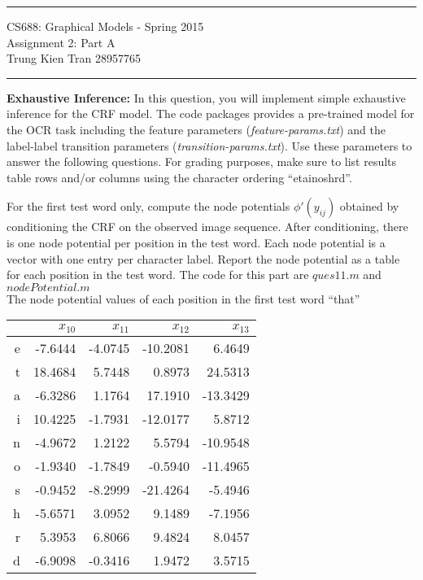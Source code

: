 \documentclass[11pt]{article}
\begin{document}
{\centering
  \rule{6.3in}{2pt}
  \vspace{1em}
  {\Large
    CS688: Graphical Models - Spring 2015\\
    Assignment 2: Part A\\
  }
  \vspace{1em}
 Trung Kien Tran 28957765\\
  \vspace{0.1em}
  \rule{6.3in}{1.5pt}
}\vspace{1em}

\begin{problem}{20} \textbf{Exhaustive Inference:} In this question, you will implement simple exhaustive inference for the CRF model. The code packages provides a pre-trained model for the OCR task including the feature parameters (\textit{feature-params.txt}) and the label-label transition parameters (\textit{transition-params.txt}). Use these parameters to answer the following questions. For grading purposes, make sure to list results table rows and/or columns using the character ordering ``etainoshrd''.

 {For the first test word only, compute the node potentials $\phi'(y_{ij})$ obtained by conditioning the CRF on the observed image sequence. After conditioning, there is one node potential per position in the test word. Each node potential is a vector with one entry per character label. Report the node potential as a table for each position in the test word.} 
The code for this part are $ques11.m$ and $nodePotential.m$\\
The node potential values of each position in the first test word ``that''
\begin{center}
\begin{tabular}{r|r|r|r|r}
 & $x_{10}$ & $x_{11}$ & $x_{12}$ & $x_{13}$ \\\hline
e  & -7.6444 & -4.0745 & -10.2081 & 6.4649 \\\hline
t  & 18.4684 & 5.7448 & 0.8973 & 24.5313 \\\hline
a  & -6.3286 & 1.1764 & 17.1910 & -13.3429 \\\hline
i  & 10.4225 & -1.7931 & -12.0177 & 5.8712 \\\hline
n  & -4.9672 & 1.2122 & 5.5794 & -10.9548 \\\hline
o  & -1.9340 & -1.7849 & -0.5940 & -11.4965 \\\hline
s  & -0.9452 & -8.2999 & -21.4264 & -5.4946 \\\hline
h  & -5.6571 & 3.0952 & 9.1489 & -7.1956 \\\hline
r  & 5.3953 & 6.8066 & 9.4824 & 8.0457 \\\hline
d  & -6.9098 & -0.3416 & 1.9472 & 3.5715 \\
\end{tabular}
\end{center}


\end{problem}
\end{document}
